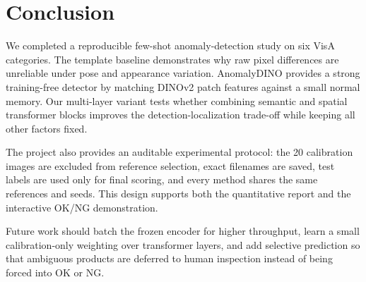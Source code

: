 \section{Conclusion}

We completed a reproducible few-shot anomaly-detection study on six VisA
categories. The template baseline demonstrates why raw pixel differences are
unreliable under pose and appearance variation. AnomalyDINO provides a strong
training-free detector by matching DINOv2 patch features against a small normal
memory. Our multi-layer variant tests whether combining semantic and spatial
transformer blocks improves the detection-localization trade-off while keeping
all other factors fixed.

The project also provides an auditable experimental protocol: the 20
calibration images are excluded from reference selection, exact filenames are
saved, test labels are used only for final scoring, and every method shares the
same references and seeds. This design supports both the quantitative report
and the interactive OK/NG demonstration.

Future work should batch the frozen encoder for higher throughput, learn a
small calibration-only weighting over transformer layers, and add selective
prediction so that ambiguous products are deferred to human inspection instead
of being forced into OK or NG.

